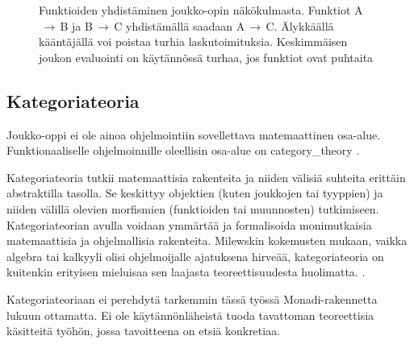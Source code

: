 \begin{figure}[htbp]
    \vspace{10pt}
    \caption{Funktioiden yhdistäminen joukko-opin näkökulmasta. Funktiot A$\,\to\,$B ja B$\,\to\,$C yhdistämällä saadaan A$\,\to\,$C. Älykkäällä kääntäjällä voi poistaa turhia laskutoimituksia. Keskimmäisen joukon evaluointi on käytännössä turhaa, jos funktiot ovat puhtaita}
    \label{fig:function_composition_in_sets}
\end{figure}


\subsection{Kategoriateoria}


Joukko-oppi ei ole ainoa ohjelmointiin sovellettava matemaattinen osa-alue. Funktionaaliselle ohjelmoinnille oleellisin osa-alue on \gls{category_theory} \cite{bartosz_category_for_progamers,promises-spec-94,dear_functional_bros}.

Kategoriateoria tutkii matemaattisia rakenteita ja niiden välisiä suhteita erittäin abstraktilla tasolla. Se keskittyy objektien (kuten joukkojen tai tyyppien) ja niiden välillä olevien morfismien (funktioiden tai muunnosten) tutkimiseen. Kategoriateorian avulla voidaan ymmärtää ja formalisoida monimutkaisia matemaattisia ja ohjelmallisia rakenteita. \citep{bartosz_category_for_progamers,promises-spec-94,category_theory}
Milewskin kokemusten mukaan, vaikka algebra tai kalkyyli olisi ohjelmoijalle ajatuksena hirveää, kategoriateoria on kuitenkin erityisen mieluisaa sen laajasta teoreettisuudesta huolimatta. \cite[9]{milewski2017category}.

Kategoriateoriaan ei perehdytä tarkemmin tässä työssä Monadi-rakennetta lukuun ottamatta. Ei ole käytännönläheistä tuoda tavattoman teoreettisia käsitteitä työhön, jossa tavoitteena on etsiä konkretiaa.

